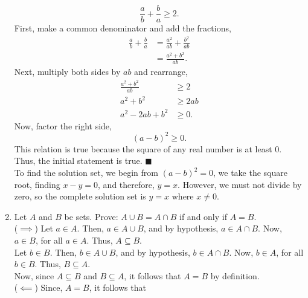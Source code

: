 \documentclass[12pt]{article}
\newcommand{\qed}{\(\blacksquare\)}
\begin{document}
\begin{enumerate}
        \begin{equation*}
            \frac{a}{b} + \frac{b}{a} \geq 2.
        \end{equation*}
        First, make a common denominator and add the fractions,
        \begin{equation*}
            \begin{split}
                \frac{a}{b} + \frac{b}{a} &= \frac{a^2}{ab} + \frac{b^2}{ab}\\
                &=\frac{a^2 + b^2}{ab}.
            \end{split}
        \end{equation*}
        Next, multiply both sides by \(ab\) and rearrange,
        \begin{equation*}
            \begin{split}
                \frac{a^2 + b^2}{ab} &\geq 2\\
                a^2 + b^2 &\geq 2ab\\
                a^2 -2ab + b^2 &\geq 0.
            \end{split}
        \end{equation*}
        Now, factor the right side,
        \begin{equation*}
            (a-b)^2\geq 0.
        \end{equation*}
        This relation is true because the square of any real number is at least 0. Thus, the initial statement is true. \qed\\
        To find the solution set, we begin from \((a-b)^2=0\), we take the square root, finding \(x-y=0\), and therefore, \(y=x\). However, we must not divide by zero, so the complete solution set is \(y=x\) where \(x\neq 0\).
        \item Let \(A\) and \(B\) be sets. Prove: \(A\cup B = A\cap B\)  if and only if \(A = B\). \\ (\(\implies\)) Let \(a\in A\). Then, \(a\in A\cup B\), and by hypothesis, \(a \in A\cap B\). Now, \(a\in B\), for all \(a \in A\). Thus, \(A\subseteq B\).\\ Let \(b\in B\). Then, \(b\in A\cup B\), and by hypothesis, \(b \in A\cap B\). Now, \(b\in A\), for all \(b \in B\). Thus, \(B\subseteq A\). \\ Now, since \(A\subseteq B\) and \(B \subseteq A\), it follows that \(A=B\) by definition.\\ (\(\impliedby\)) Since, \(A=B\), it follows that
        \begin{equation*}
            \begin{split}

\end{split}
\end{equation*}
\end{enumerate}
\end{document}
